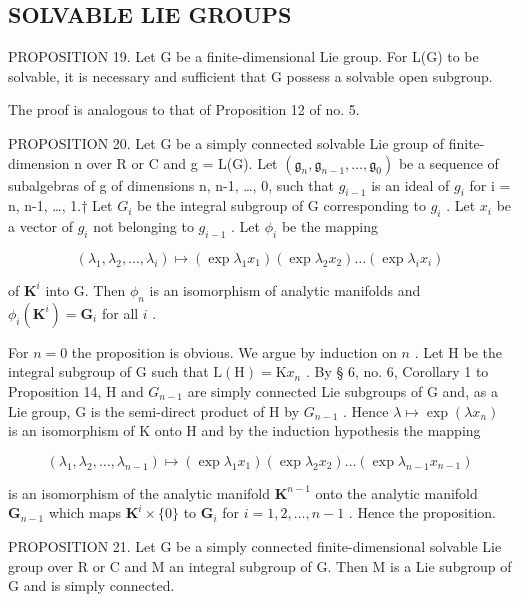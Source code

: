 \subsection{SOLVABLE LIE GROUPS}

PROPOSITION 19. Let G be a finite-dimensional Lie group. For L(G) to be solvable, it is necessary and sufficient that G possess a solvable open subgroup.

The proof is analogous to that of Proposition 12 of no. 5.

PROPOSITION 20. Let G be a simply connected solvable Lie group of finite-dimension n over R or C and g = L(G). Let \((\mathfrak{g}_{n}, \mathfrak{g}_{n-1}, \ldots, \mathfrak{g}_{0})\) be a sequence of subalgebras of g of dimensions n, n-1, \ldots, 0, such that \(g_{i-1}\) is an ideal of \(g_{i}\) for i = n, n-1, \ldots, 1.† Let \(G_{i}\) be the integral subgroup of G corresponding to \(g_{i}\) . Let \(x_{i}\) be a vector of \(g_{i}\) not belonging to \(g_{i-1}\) . Let \(\phi_{i}\) be the mapping

\[
\left(\lambda_ {1}, \lambda_ {2}, \dots , \lambda_ {i}\right) \mapsto \left(\exp \lambda_ {1} x _ {1}\right) \left(\exp \lambda_ {2} x _ {2}\right) \dots \left(\exp \lambda_ {i} x _ {i}\right)
\]

of \(\mathbf{K}^i\) into G. Then \(\phi_n\) is an isomorphism of analytic manifolds and \(\phi_i(\mathbf{K}^i) = \mathbf{G}_i\) for all \(i\) .

For \(n = 0\) the proposition is obvious. We argue by induction on \(n\) . Let H be the integral subgroup of G such that \(\mathrm{L(H)} = \mathrm{K}x_n\) . By § 6, no. 6, Corollary 1 to Proposition 14, H and \(G_{n-1}\) are simply connected Lie subgroups of G and, as a Lie group, G is the semi-direct product of H by \(G_{n-1}\) . Hence \(\lambda \mapsto \exp (\lambda x_n)\) is an isomorphism of K onto H and by the induction hypothesis the mapping

\[
\left(\lambda_ {1}, \lambda_ {2}, \dots , \lambda_ {n - 1}\right) \mapsto \left(\exp \lambda_ {1} x _ {1}\right) \left(\exp \lambda_ {2} x _ {2}\right) \dots \left(\exp \lambda_ {n - 1} x _ {n - 1}\right)
\]

is an isomorphism of the analytic manifold \(\mathbf{K}^{n - 1}\) onto the analytic manifold \(\mathbf{G}_{n - 1}\) which maps \(\mathbf{K}^i\times \{0\}\) to \(\mathbf{G}_i\) for \(i = 1,2,\ldots ,n - 1\) . Hence the proposition.

PROPOSITION 21. Let G be a simply connected finite-dimensional solvable Lie group over R or C and M an integral subgroup of G. Then M is a Lie subgroup of G and is simply connected.

